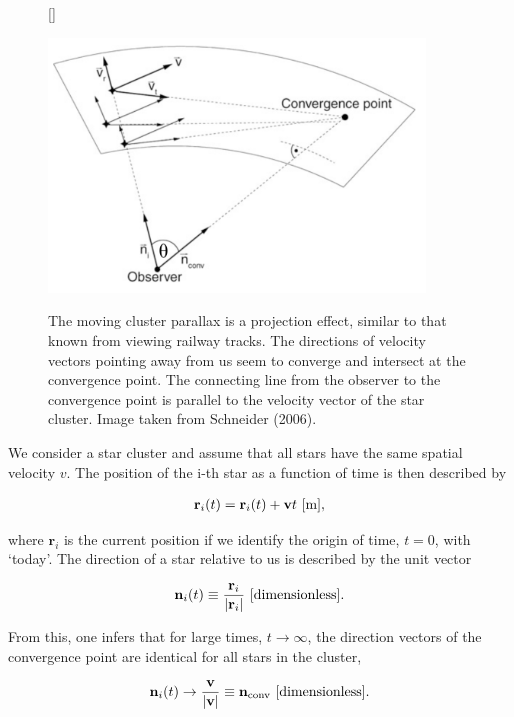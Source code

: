 \documentclass[a4paper,10pt]{article}
\begin{document}
\begin{figure}[h]
    [\FBwidth]
    {\caption{\footnotesize{The moving cluster parallax is a projection effect, similar to that known from viewing railway tracks. The directions of velocity vectors pointing away from us seem to converge and intersect at the convergence point. The connecting line from the observer to the convergence point is parallel to the velocity vector of the star cluster. Image taken from Schneider (2006).}}
    \label{fig:clusterparallax}}
    {\includegraphics[width=10cm]{figures/ClusterParallax.png}}
\end{figure}

{\noindent}We consider a star cluster and assume that all stars have the same spatial velocity $v$. The position of the i-th star as a function of time is then described by

\begin{align*}
    \mathbf{r}_i(t) = \mathbf{r}_i(t) + \mathbf{v}t ~ [{\rm m}],
\end{align*}

{\noindent}where $\mathbf{r}_i$ is the current position if we identify the origin of time, $t=0$, with `today'. The direction of a star relative to us is described by the unit vector

\begin{align*}
    \mathbf{n}_i(t) \equiv \frac{\mathbf{r}_i}{\lvert\mathbf{r}_i\rvert} ~ [{\rm dimensionless}].
\end{align*}

{\noindent}From this, one infers that for large times, $t\rightarrow\infty$, the direction vectors of the convergence point are identical for all stars in the cluster,

\begin{align*}
    \mathbf{n}_i(t) \rightarrow \frac{\mathbf{v}}{\lvert\mathbf{v}\rvert} \equiv \mathbf{n}_\mathrm{conv} ~ [{\rm dimensionless}].
\end{align*}
\end{document}
